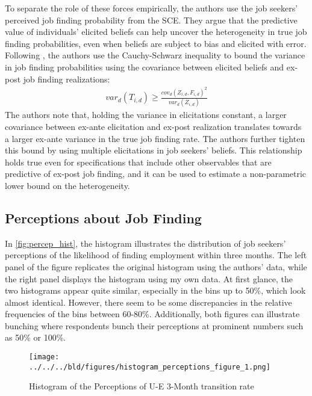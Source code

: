 \documentclass[11pt,a4paper,leqno]{article}
\begin{document}
To separate the role of these forces empirically, the authors use the job seekers' perceived job finding probability from the SCE. They argue that the predictive value of individuals' elicited beliefs can help uncover the heterogeneity in true job finding probabilities, even when beliefs are subject to bias and elicited with error. 
Following \textcite{Morrison2019}, the authors use the Cauchy-Schwarz inequality to bound the variance in job finding probabilities using the covariance between elicited beliefs and ex-post job finding realizations:
\begin{align}
	var_d (T_{i,d}) \geq   \frac{cov_d (Z_{i,d},F_{i,d} )^{2}}{var_d (Z_{i,d}) }
\end{align}
The authors note that, holding the variance in elicitations constant, a larger covariance between ex-ante elicitation and ex-post realization translates towards a larger ex-ante variance in the true job finding rate. The authors further tighten this bound by using multiple elicitations in job seekers' beliefs. This relationship holds true even for specifications that include other observables that are predictive of ex-post job finding, and it can be used to estimate a non-parametric lower bound on the heterogeneity.

\subsection*{Perceptions about Job Finding}

In \autoref{fig:percep_hist}, the histogram illustrates the distribution of job seekers' perceptions of the likelihood of finding employment within three months. The left panel of the figure replicates the original histogram using the authors' data, while the right panel displays the histogram using my own data. At first glance, the two histograms appear quite similar, especially in the bins up to 50\%, which look almost identical. However, there seem to be some discrepancies in the relative frequencies of the bins between 60-80\%. Additionally, both figures can illustrate bunching where respondents bunch their perceptions at prominent numbers such as 50\% or 100\%. 

\begin{figure}[!htbp] \centering
	\texttt{[image: ../../../bld/figures/histogram\_perceptions\_figure\_1.png]}
	\caption{Histogram of the Perceptions of U-E 3-Month transition rate}
	\label{fig:percep_hist}
\end{figure}
\end{document}
